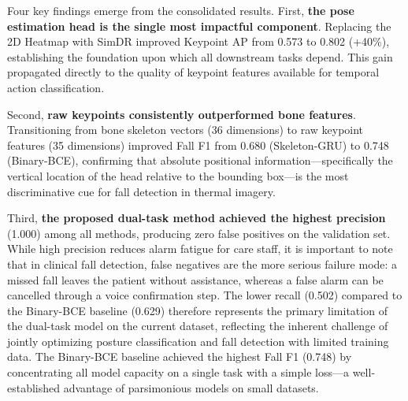 \begin{table}[t]
\centering
\caption{Complete system comparison. bbox mAP and Kpt AP are evaluated on the frozen Stage~1 checkpoint integrated into the full pipeline and therefore differ from the standalone Stage~1 results in Table~\ref{tab:pose_comparison}.}
\label{tab:full_system}
\end{table}

Four key findings emerge from the consolidated results. First, \textbf{the pose estimation head is the single most impactful component}. Replacing the 2D Heatmap with SimDR improved Keypoint AP from 0.573 to 0.802 (+40\%), establishing the foundation upon which all downstream tasks depend. This gain propagated directly to the quality of keypoint features available for temporal action classification.

Second, \textbf{raw keypoints consistently outperformed bone features}. Transitioning from bone skeleton vectors (36 dimensions) to raw keypoint features (35 dimensions) improved Fall F1 from 0.680 (Skeleton-GRU) to 0.748 (Binary-BCE), confirming that absolute positional information---specifically the vertical location of the head relative to the bounding box---is the most discriminative cue for fall detection in thermal imagery.

Third, \textbf{the proposed dual-task method achieved the highest precision} (1.000) among all methods, producing zero false positives on the validation set. While high precision reduces alarm fatigue for care staff, it is important to note that in clinical fall detection, false negatives are the more serious failure mode: a missed fall leaves the patient without assistance, whereas a false alarm can be cancelled through a voice confirmation step. The lower recall (0.502) compared to the Binary-BCE baseline (0.629) therefore represents the primary limitation of the dual-task model on the current dataset, reflecting the inherent challenge of jointly optimizing posture classification and fall detection with limited training data. The Binary-BCE baseline achieved the highest Fall F1 (0.748) by concentrating all model capacity on a single task with a simple loss---a well-established advantage of parsimonious models on small datasets.

